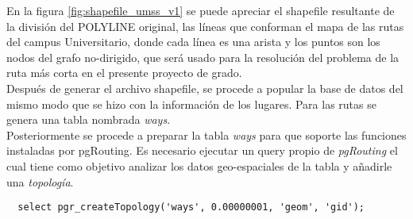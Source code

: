  En la figura \ref{fig:shapefile_umss_v1} se puede apreciar el shapefile resultante de la división del POLYLINE original, las líneas que conforman el mapa de las rutas del campus Universitario, donde cada línea es una arista y los puntos son los nodos del grafo no-dirigido, que será usado para la resolución del problema de la ruta más corta en el presente proyecto de grado.\\



Después de generar el archivo shapefile, se procede a popular la base de datos del mismo modo que se hizo con la información de los lugares. Para las rutas se genera una tabla nombrada \emph{ways}.\\

Posteriormente se procede a preparar la tabla \emph{ways} para que soporte las funciones instaladas por pgRouting.
Es necesario ejecutar un query propio de \emph{pgRouting} el cual tiene como objetivo analizar los datos geo-espaciales de la tabla y añadirle una \emph{topología}.\\

\begin{verbatim}
  select pgr_createTopology('ways', 0.00000001, 'geom', 'gid');
\end{verbatim}

